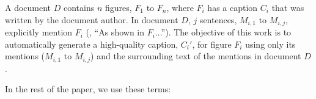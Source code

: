
A document $D$ contains $n$ figures, $F_1$ to $F_n$, where $F_i$ has a caption $C_i$ that was written by the document author.
In document $D$, $j$ sentences, $M_{i,1}$ to $M_{i,j}$, explicitly mention $F_i$ (\eg, ``As shown in $F_i$...'').
The objective of this work is to automatically generate a high-quality caption, $C_i'$, for figure $F_i$ using only its mentions ($M_{i,1}$ to $M_{i,j}$) and the surrounding text of the mentions in document $D$.

In the rest of the paper, we use these terms:

